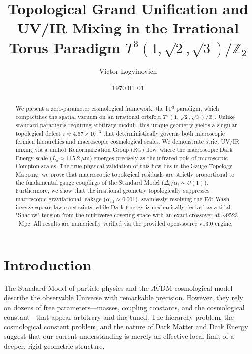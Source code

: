 \documentclass[aps,prd,twocolumn,groupedaddress,superscriptaddress,amsmath,amssymb]{revtex4-2}
\begin{document}
\title{Topological Grand Unification and UV/IR Mixing in the Irrational Torus Paradigm $T^3(1,\sqrt{2},\sqrt{3})/\mathbb{Z}_2$}

\author{Victor Logvinovich}

\date{\today}

\begin{abstract}
We present a zero-parameter cosmological framework, the IT$^3$ paradigm, which compactifies the spatial vacuum on an irrational orbifold $T^3(1,\sqrt{2},\sqrt{3})/\mathbb{Z}_2$. Unlike standard paradigms requiring arbitrary moduli, this unique geometry yields a singular topological defect $\varepsilon \approx 4.67 \times 10^{-3}$ that deterministically governs both microscopic fermion hierarchies and macroscopic cosmological scales. We demonstrate strict UV/IR mixing via a unified Renormalization Group (RG) flow, where the macroscopic Dark Energy scale ($L_x \approx 115.2~\mu\text{m}$) emerges precisely as the infrared pole of microscopic Compton scales. The true physical validation of this flow lies in the Gauge-Topology Mapping: we prove that macroscopic topological residuals are strictly proportional to the fundamental gauge couplings of the Standard Model ($\Delta_i / \alpha_i \sim \mathcal{O}(1)$). Furthermore, we show that the irrational geometry topologically suppresses macroscopic gravitational leakage ($\alpha_{\text{eff}} \approx 0.001$), seamlessly resolving the Eöt-Wash inverse-square law constraints, while Dark Energy is mechanically derived as a tidal "Shadow" tension from the multiverse covering space with an exact crossover at $\sim 9523$~Mpc. All results are numerically verified via the provided open-source v13.0 engine.
\end{abstract}


\maketitle

\section{Introduction}
The Standard Model of particle physics and the $\Lambda$CDM cosmological model describe the observable Universe with remarkable precision. However, they rely on dozens of free parameters---masses, coupling constants, and the cosmological constant---that appear arbitrary and fine-tuned. The hierarchy problem, the cosmological constant problem, and the nature of Dark Matter and Dark Energy suggest that our current understanding is merely an effective local limit of a deeper, rigid geometric structure.
\end{document}
